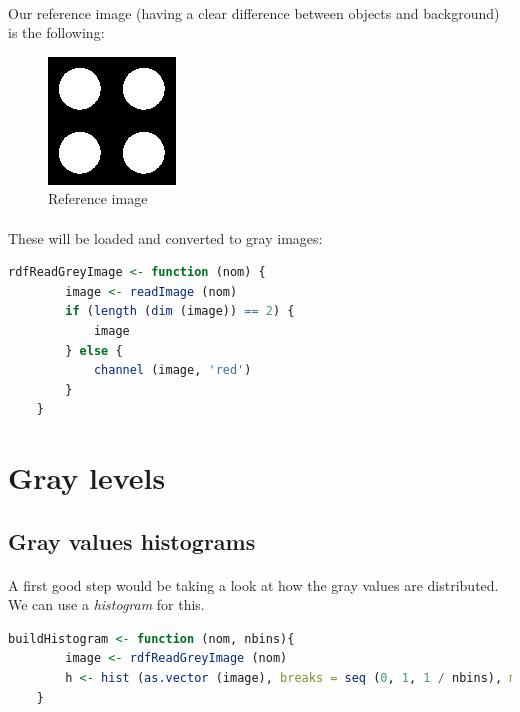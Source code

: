 \paragraph{}
Our reference image (having a clear difference between objects and background) is the following:
\begin{figure}[h]
    \centering
    \includegraphics[scale=0.6]{rdf-masque-ronds.png}
    \caption{Reference image}
    \label{fig-reference-image}
\end{figure}

\paragraph{}
These will be loaded and converted to gray images:
\begin{lstlisting}[language=R, caption=Loading images]
    rdfReadGreyImage <- function (nom) {
        image <- readImage (nom)
        if (length (dim (image)) == 2) {
            image
        } else {
            channel (image, 'red')
        }
    }
\end{lstlisting}

\clearpage

\section{Gray levels}
\subsection{Gray values histograms}
\paragraph{}
A first good step would be taking a look at how the gray values are distributed. We can use a \emph{histogram} for this.
\begin{lstlisting}[language=R, caption=Creating histograms of gray values]
    buildHistogram <- function (nom, nbins){
        image <- rdfReadGreyImage (nom)
        h <- hist (as.vector (image), breaks = seq (0, 1, 1 / nbins), main = nom)
    }
\end{lstlisting}

